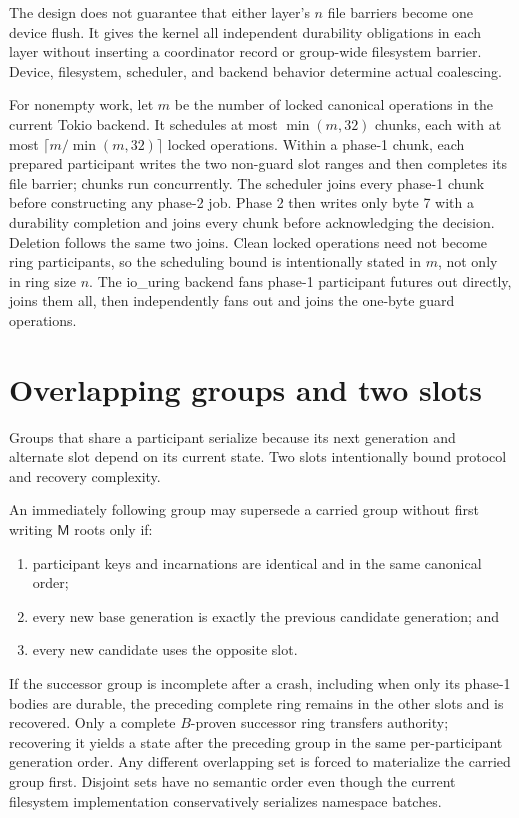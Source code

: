 \documentclass[10pt,twocolumn]{article}
\theoremstyle{remark}
\newcommand{\Materialized}{\mathsf{M}}
\begin{document}
The design does not guarantee that either layer's $n$ file barriers become one device flush. It
gives the kernel all independent durability obligations in each layer without inserting a
coordinator record or group-wide filesystem barrier. Device, filesystem, scheduler, and backend
behavior determine actual coalescing.

For nonempty work, let $m$ be the number of locked canonical operations in the current Tokio
backend. It schedules at most $\min(m,32)$ chunks, each with at most
$\lceil m/\min(m,32)\rceil$ locked operations. Within a phase-1 chunk, each prepared participant
writes the two non-guard slot ranges and then completes its file barrier; chunks run concurrently.
The scheduler joins every phase-1 chunk before constructing any phase-2 job. Phase 2 then writes
only byte 7 with a durability completion and joins every chunk before acknowledging the decision.
Deletion follows the same two joins. Clean locked operations need not become ring participants, so
the scheduling bound is intentionally stated in $m$, not only in ring size $n$. The io\_uring
backend fans phase-1 participant futures out directly, joins them all, then independently fans out
and joins the one-byte guard operations.

\section{Overlapping groups and two slots}

Groups that share a participant serialize because its next generation and alternate slot depend
on its current state. Two slots intentionally bound protocol and recovery complexity.

An immediately following group may supersede a carried group without first writing
$\Materialized$ roots only if:
\begin{enumerate}
  \item participant keys and incarnations are identical and in the same canonical order;
  \item every new base generation is exactly the previous candidate generation; and
  \item every new candidate uses the opposite slot.
\end{enumerate}
If the successor group is incomplete after a crash, including when only its phase-1 bodies are
durable, the preceding complete ring remains in the other slots and is recovered. Only a complete
$B$-proven successor ring transfers authority; recovering it yields a state after the preceding
group in the same per-participant generation order. Any different overlapping
set is forced to materialize the carried group first. Disjoint sets have no semantic order even
though the current filesystem implementation conservatively serializes namespace batches.
\end{document}
